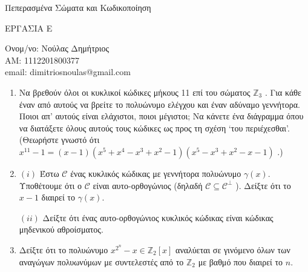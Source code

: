 \documentclass[oneside,a4paper]{article}
\newcommand {\tl}{\textlatin}
\newcommand{\Z}{\mathbb{Z}}
\begin{document}
	
	
	\begin{framed}	
		\begin{center}
			\huge Πεπερασμένα Σώματα και Κωδικοποίηση
		\end{center}
		\begin{center}
			ΕΡΓΑΣΙΑ E\\
		\end{center}
		\begin{center}
			Ονομ/νο: Νούλας Δημήτριος\\
			ΑΜ: 1112201800377\\
			\tl{email}: \tl{dimitriosnoulas@gmail.com}
		\end{center}
		\vspace{0.3truecm}
	\end{framed}
\vspace{1cm}

\begin{enumerate}

	\item Να βρεθούν όλοι οι κυκλικοί κώδικες μήκους 11 επί του σώματος $\Z_3$ . Για κάθε έναν από αυτούς να βρείτε το πολυώνυμο ελέγχου και έναν αδύναμο γεννήτορα. Ποιοι απ’ αυτούς είναι ελάχιστοι, ποιοι μέγιστοι; Να κάνετε ένα διάγραμμα όπου να διατάξετε όλους αυτούς τους κώδικες ως προς τη σχέση ‘του περιέχεσθαι’. (Θεωρήστε γνωστό ότι $x^{11} - 1 = (x - 1)(x^5 + x^4 - x^3 + x^2 - 1)(x^5 - x^3 + x^2 - x - 1)$ .)
	$ $\newline

	\item $(i)$ Έστω $\mathcal{C}$ ένας κυκλικός κώδικας με γεννήτορα πολυώνυμο $\gamma (x)$. Υποθέτουμε ότι ο $\mathcal{C}$ είναι αυτο-ορθογώνιος (δηλαδή $\mathcal{C} \subseteq \mathcal{C}^{\perp}$ ). Δείξτε ότι το $x-1$ διαιρεί το $\gamma (x) $.
	
$(ii)$ Δείξτε ότι ένας αυτο-ορθογώνιος κυκλικός κώδικας είναι κώδικας μηδενικού αθροίσματος.
	$ $\newline

	\item Δείξτε ότι το πολυώνυμο $x^{2^n} - x \in \Z_2 [x]$ αναλύεται σε γινόμενο όλων των αναγώγων πολυωνύμων με συντελεστές από το $\Z_2 $ με βαθμό που διαιρεί το $n$.

\end{enumerate}
\end{document}
